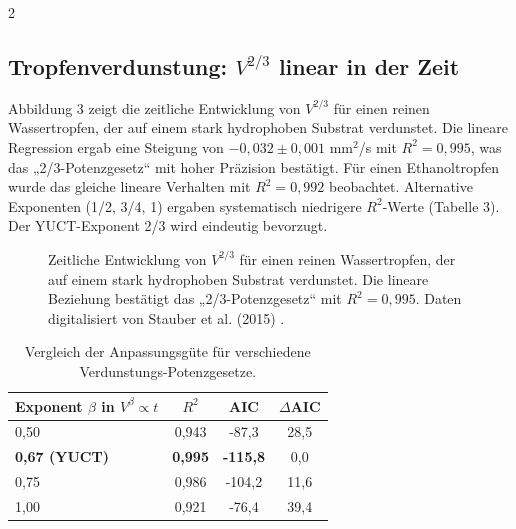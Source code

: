 \documentclass[11pt,a4paper]{article}
\begin{document}
\begin{multicols}{2}
		\subsection{Tropfenverdunstung: $V^{2/3}$ linear in der Zeit}
		
		Abbildung 3 zeigt die zeitliche Entwicklung von \(V^{2/3}\) für einen reinen Wassertropfen, der auf einem stark hydrophoben Substrat verdunstet. Die lineare Regression ergab eine Steigung von \(-0,032 \pm 0,001\) mm\(^2\)/s mit \(R^2 = 0,995\), was das „2/3-Potenzgesetz“ mit hoher Präzision bestätigt. Für einen Ethanoltropfen wurde das gleiche lineare Verhalten mit \(R^2 = 0,992\) beobachtet. Alternative Exponenten (1/2, 3/4, 1) ergaben systematisch niedrigere \(R^2\)-Werte (Tabelle 3). Der YUCT-Exponent 2/3 wird eindeutig bevorzugt.
		
		\begin{figure}[htbp]
			\centering
			\caption{Zeitliche Entwicklung von \(V^{2/3}\) für einen reinen Wassertropfen, der auf einem stark hydrophoben Substrat verdunstet. Die lineare Beziehung bestätigt das „2/3-Potenzgesetz“ mit \(R^2 = 0,995\). Daten digitalisiert von Stauber et al. (2015) \cite{Stauber2015}.}
			\label{fig:evaporation}
		\end{figure}
		
		\begin{table}[htbp]
			\centering
			\caption{Vergleich der Anpassungsgüte für verschiedene Verdunstungs-Potenzgesetze.}
			\label{tab:evaporation}
			\begin{tabular}{lccc}
				\toprule
				\textbf{Exponent $\beta$ in $V^{\beta} \propto t$} & $R^2$ & AIC & $\Delta$AIC \\
				\midrule
				0,50 & 0,943 & -87,3 & 28,5 \\
				\textbf{0,67 (YUCT)} & \textbf{0,995} & \textbf{-115,8} & 0,0 \\
				0,75 & 0,986 & -104,2 & 11,6 \\
				1,00 & 0,921 & -76,4 & 39,4 \\
				\bottomrule
			\end{tabular}
		\end{table}
		

\end{multicols}
\end{document}
